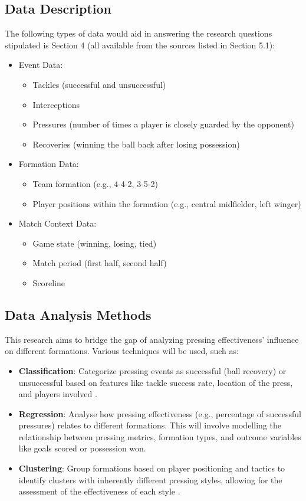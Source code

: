 \documentclass[12pt]{article}
\begin{document}
\subsection{Data Description}
The following types of data would aid in answering the research questions stipulated is Section 4 (all available from the sources listed in Section 5.1):
\begin{itemize}
    \item Event Data:
    \begin{itemize}
        \item Tackles (successful and unsuccessful)
        \item Interceptions
        \item Pressures (number of times a player is closely guarded by the opponent)
        \item Recoveries (winning the ball back after losing possession)
    \end{itemize}
    \item Formation Data:
    \begin{itemize}
        \item Team formation (e.g., 4-4-2, 3-5-2)
        \item Player positions within the formation (e.g., central midfielder, left winger)
    \end{itemize}
    \item Match Context Data:
    \begin{itemize}
        \item Game state (winning, losing, tied)
        \item Match period (first half, second half)
        \item Scoreline
    \end{itemize}
\end{itemize}

\subsection{Data Analysis Methods}
This research aims to bridge the gap of analyzing pressing effectiveness' influence on different formations. Various techniques will be used, such as:
\begin{itemize}
    \item \textbf{Classification}: Categorize pressing events as successful (ball recovery) or unsuccessful based on features like tackle success rate, location of the press, and players involved \cite{forcher2022use}.
    \item \textbf{Regression}: Analyse how pressing effectiveness (e.g., percentage of successful pressures) relates to different formations. This will involve modelling the relationship between pressing metrics, formation types, and outcome variables like goals scored or possession won.
    \item \textbf{Clustering}: Group formations based on player positioning and tactics to identify clusters with inherently different pressing styles, allowing for the assessment of the effectiveness of each style \cite{merhej2021happened}.
\end{itemize}
\end{document}
